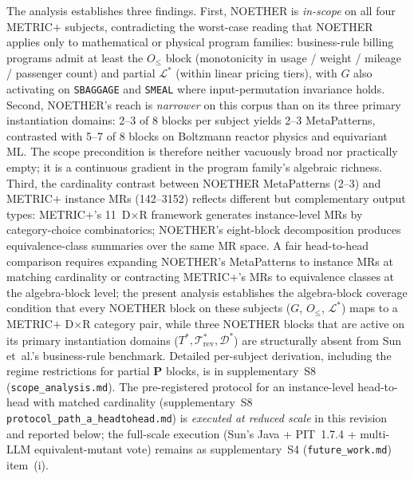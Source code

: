\documentclass[acmsmall, screen]{acmart}
\newcommand{\tildemark}{\textbf{P}}
\begin{document}
The analysis establishes three findings. First, NOETHER is
\emph{in-scope} on all four METRIC$+$ subjects, contradicting the
worst-case reading that NOETHER applies only to mathematical or
physical program families: business-rule billing programs admit at
least the $O_{\le}$ block (monotonicity in usage / weight / mileage /
passenger count) and partial $\mathcal{L}^{*}$ (within linear pricing
tiers), with $G$ also activating on \texttt{SBAGGAGE} and
\texttt{SMEAL} where input-permutation invariance holds. Second,
NOETHER's reach is \emph{narrower} on this corpus than on its three
primary instantiation domains: 2--3 of 8 blocks per subject yields
2--3 MetaPatterns, contrasted with 5--7 of 8 blocks on Boltzmann
reactor physics and equivariant ML. The scope precondition is
therefore neither vacuously broad nor practically empty; it is a
continuous gradient in the program family's algebraic richness.
Third, the cardinality contrast between NOETHER MetaPatterns (2--3)
and METRIC$+$ instance MRs (142--3152) reflects different but
complementary output types: METRIC$+$'s 11~D$\times$R framework
generates instance-level MRs by category-choice combinatorics;
NOETHER's eight-block decomposition produces equivalence-class
summaries over the same MR space. A fair head-to-head comparison
requires expanding NOETHER's MetaPatterns to instance MRs at
matching cardinality or contracting METRIC$+$'s MRs to equivalence
classes at the algebra-block level; the present analysis establishes
the algebra-block coverage condition that every NOETHER block on
these subjects ($G$, $O_{\le}$, $\mathcal{L}^{*}$) maps to a
METRIC$+$ D$\times$R category pair, while three NOETHER blocks that
are active on its primary instantiation domains
($T^{*}, \mathcal{T}^{*}_{\mathrm{rev}}, \mathcal{D}^{*}$) are
structurally absent from Sun et~al.'s business-rule benchmark.
Detailed per-subject derivation, including the regime restrictions
for partial \tildemark{} blocks, is in supplementary~S8
(\texttt{scope\_analysis.md}). The pre-registered protocol for an
instance-level head-to-head with matched cardinality
(supplementary~S8 \texttt{protocol\_path\_a\_headtohead.md}) is
\emph{executed at reduced scale} in this revision and reported below;
the full-scale execution (Sun's Java + PIT~1.7.4 + multi-LLM
equivalent-mutant vote) remains as supplementary~S4 (\texttt{future\_work.md})
item~(i).
\end{document}
